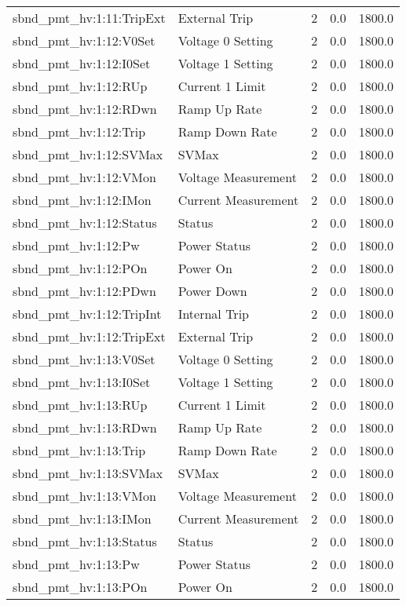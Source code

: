 \begin{center}
\begin{longtable}{l | l l l l }
sbnd\_pmt\_hv:1:11:TripExt & External Trip & 2 & 0.0 & 1800.0\\ 
sbnd\_pmt\_hv:1:12:V0Set & Voltage 0 Setting & 2 & 0.0 & 1800.0\\ 
sbnd\_pmt\_hv:1:12:I0Set & Voltage 1 Setting & 2 & 0.0 & 1800.0\\ 
sbnd\_pmt\_hv:1:12:RUp & Current 1 Limit & 2 & 0.0 & 1800.0\\ 
sbnd\_pmt\_hv:1:12:RDwn & Ramp Up Rate & 2 & 0.0 & 1800.0\\ 
sbnd\_pmt\_hv:1:12:Trip & Ramp Down Rate & 2 & 0.0 & 1800.0\\ 
sbnd\_pmt\_hv:1:12:SVMax & SVMax & 2 & 0.0 & 1800.0\\ 
sbnd\_pmt\_hv:1:12:VMon & Voltage Measurement & 2 & 0.0 & 1800.0\\ 
sbnd\_pmt\_hv:1:12:IMon & Current Measurement & 2 & 0.0 & 1800.0\\ 
sbnd\_pmt\_hv:1:12:Status & Status & 2 & 0.0 & 1800.0\\ 
sbnd\_pmt\_hv:1:12:Pw & Power Status & 2 & 0.0 & 1800.0\\ 
sbnd\_pmt\_hv:1:12:POn & Power On & 2 & 0.0 & 1800.0\\ 
sbnd\_pmt\_hv:1:12:PDwn & Power Down & 2 & 0.0 & 1800.0\\ 
sbnd\_pmt\_hv:1:12:TripInt & Internal Trip & 2 & 0.0 & 1800.0\\ 
sbnd\_pmt\_hv:1:12:TripExt & External Trip & 2 & 0.0 & 1800.0\\ 
sbnd\_pmt\_hv:1:13:V0Set & Voltage 0 Setting & 2 & 0.0 & 1800.0\\ 
sbnd\_pmt\_hv:1:13:I0Set & Voltage 1 Setting & 2 & 0.0 & 1800.0\\ 
sbnd\_pmt\_hv:1:13:RUp & Current 1 Limit & 2 & 0.0 & 1800.0\\ 
sbnd\_pmt\_hv:1:13:RDwn & Ramp Up Rate & 2 & 0.0 & 1800.0\\ 
sbnd\_pmt\_hv:1:13:Trip & Ramp Down Rate & 2 & 0.0 & 1800.0\\ 
sbnd\_pmt\_hv:1:13:SVMax & SVMax & 2 & 0.0 & 1800.0\\ 
sbnd\_pmt\_hv:1:13:VMon & Voltage Measurement & 2 & 0.0 & 1800.0\\ 
sbnd\_pmt\_hv:1:13:IMon & Current Measurement & 2 & 0.0 & 1800.0\\ 
sbnd\_pmt\_hv:1:13:Status & Status & 2 & 0.0 & 1800.0\\ 
sbnd\_pmt\_hv:1:13:Pw & Power Status & 2 & 0.0 & 1800.0\\ 
sbnd\_pmt\_hv:1:13:POn & Power On & 2 & 0.0 & 1800.0\\ 

\end{longtable}
\end{center}
